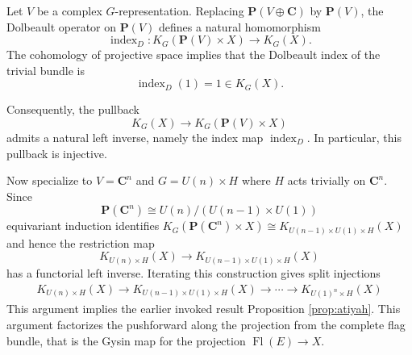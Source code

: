 \documentclass[12pt]{article}
\begin{document}
Let \(V\) be a complex \(G\)-representation. Replacing
\(\mathbf P(V\oplus\mathbf C)\) by \(\mathbf P(V)\), the Dolbeault operator on
\(\mathbf P(V)\) defines a natural homomorphism
\[
    \operatorname{index}_D:
    K_G(\mathbf P(V)\times X)
    \longrightarrow
    K_G(X).
\]
The cohomology of projective space implies that
the Dolbeault index of the trivial bundle is
\[
    \operatorname{index}_D(1)=1\in K_G(X).
\]

Consequently, the pullback
\[
    K_G(X)
    \longrightarrow
    K_G(\mathbf P(V)\times X)
\]
admits a natural left inverse, namely the index map
\(\operatorname{index}_D\). In particular, this pullback is injective.

Now specialize to $V=\mathbf C^n$ and $G=U(n)\times H$
where \(H\) acts trivially on \(\mathbf C^n\). Since
\[
    \mathbf P(\mathbf C^n)
    \cong
    U(n)/(U(n-1)\times U(1))
\]
equivariant induction identifies $
    K_G(\mathbf P(\mathbf C^n)\times X)
    \cong
    K_{U(n-1)\times U(1)\times H}(X)$ and hence the restriction map
\[
    K_{U(n)\times H}(X)
    \longrightarrow
    K_{U(n-1)\times U(1)\times H}(X)
\]
has a functorial left inverse. Iterating this construction gives split injections
\begin{align*}
    K_{U(n)\times H}(X)
    \longrightarrow
    K_{U(n-1)\times U(1)\times H}(X) 
    \longrightarrow
    \cdots 
    \longrightarrow
    K_{U(1)^n\times H}(X)
\end{align*}
This argument implies the earlier invoked result Proposition \ref{prop:atiyah}. This argument factorizes the pushforward along the projection from the complete flag bundle, that is the Gysin map for the projection $\operatorname{Fl}(E)\longrightarrow X$.
\end{document}
